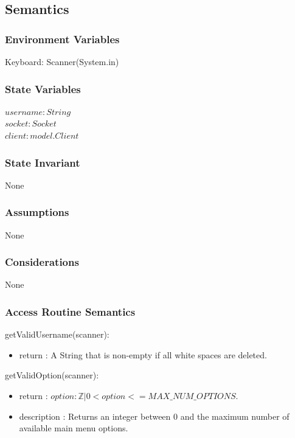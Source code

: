 \documentclass[12pt, titlepage]{article}
\begin{document}
    \subsection* {Semantics}
    
    \subsubsection* {Environment Variables}
        Keyboard: Scanner(System.in)
        
    \subsubsection* {State Variables}
        $\mathit{username}: String$\\
        $\mathit{socket}: Socket$\\
        $\mathit{client} : model.Client$\\
    
    \subsubsection* {State Invariant}
        None
    
    \subsubsection* {Assumptions}
        None
    
    \subsubsection* {Considerations}
        None
    
    \subsubsection* {Access Routine Semantics}
    
        \noindent getValidUsername(scanner):
        \begin{itemize}
        \item return : A String that is non-empty if all white spaces are deleted.
        \end{itemize}
        
        \noindent getValidOption(scanner):
        \begin{itemize}
        \item return : $option : \mathbb{Z} | 0 < option <= MAX\_NUM\_OPTIONS$.
        \item description : Returns an integer between 0 and the maximum number of available main menu options.
        \end{itemize}
        
\end{document}

